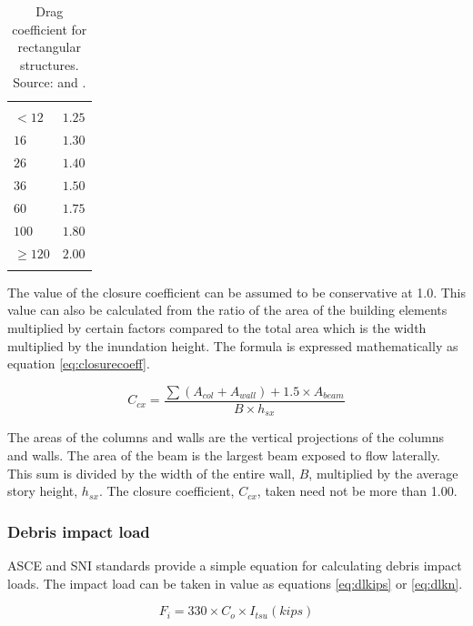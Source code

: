 \documentclass{cup-pan}
\begin{document}
\renewcommand{\arraystretch}{1}
\begin{longtable}{P{2in} P{2in}}
\caption{Drag coefficient for rectangular structures. Source: \cite{sni172720} and \cite{asce}.}\\

\headrow {} &   \\
$<12$ &$1.25$\\
$16$ & $1.30$\\
$26$ & $1.40$\\
$36$ & $1.50$\\
$60$ & $1.75$\\
$100$ & $1.80$\\
$\geq 120$ & $2.00$\\
\label{tab:dragcoeff}
\end{longtable}

The value of the closure coefficient can be assumed to be conservative at 1.0. This value can also be calculated from the ratio of the area of the building elements multiplied by certain factors compared to the total area which is the width multiplied by the inundation height. The formula is expressed mathematically as equation \ref{eq:closurecoeff}.

\begin{equation}
C_{cx}= \frac{\sum(A_{col}+A_{wall})+1.5 \times A_{beam}}{B \times h_{sx}}\label{eq:closurecoeff}
\end{equation}

The areas of the columns and walls are the vertical projections of the columns and walls. The area of the beam is the largest beam exposed to flow laterally. This sum is divided by the width of the entire wall, $B$, multiplied by the average story height, $h_{sx}$.  The closure coefficient, $C_{cx}$, taken need not be more than \num{1.00}.

\subsubsection{Debris impact load}
ASCE and SNI standards provide a simple equation for calculating debris impact loads. The impact load can be taken in value as equations \ref{eq:dlkips} or \ref{eq:dlkn}.

\begin{equation}
F_{i} = 330 \times C_o \times I_{tsu} (kips)
\label{eq:dlkips}
\end{equation}
\end{document}
